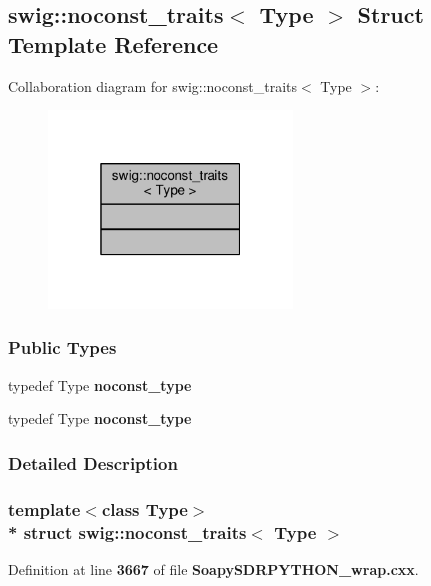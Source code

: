 \subsection{swig\+:\+:noconst\+\_\+traits$<$ Type $>$ Struct Template Reference}
\label{structswig_1_1noconst__traits}


Collaboration diagram for swig\+:\+:noconst\+\_\+traits$<$ Type $>$\+:
\nopagebreak
\begin{figure}[H]
\begin{center}
\leavevmode
\includegraphics[width=184pt]{d2/d54/structswig_1_1noconst__traits__coll__graph}
\end{center}
\end{figure}
\subsubsection*{Public Types}
\begin{DoxyCompactItemize}
\item 
typedef Type {\bf noconst\+\_\+type}
\item 
typedef Type {\bf noconst\+\_\+type}
\end{DoxyCompactItemize}


\subsubsection{Detailed Description}
\subsubsection*{template$<$class Type$>$\\*
struct swig\+::noconst\+\_\+traits$<$ Type $>$}



Definition at line {\bf 3667} of file {\bf Soapy\+S\+D\+R\+P\+Y\+T\+H\+O\+N\+\_\+wrap.\+cxx}.



